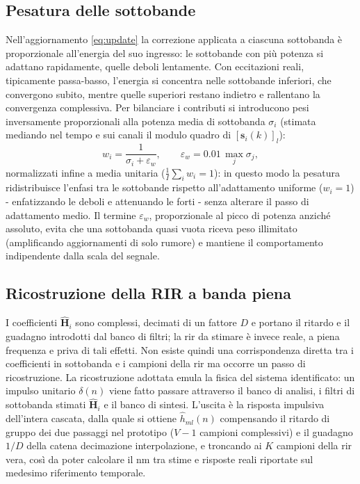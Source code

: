 \documentclass[11pt,a4paper]{article}
\begin{document}
	\subsection{Pesatura delle sottobande}\label{ssec:weights}
	Nell'aggiornamento \eqref{eq:update} la correzione applicata a ciascuna sottobanda è proporzionale all'energia del suo ingresso: le sottobande con più potenza si adattano rapidamente, quelle deboli lentamente.
	Con eccitazioni reali, tipicamente passa-basso, l'energia si concentra nelle sottobande inferiori, che convergono subito, mentre quelle superiori restano indietro e rallentano la convergenza complessiva.
	Per bilanciare i contributi si introducono pesi inversamente proporzionali alla potenza media di sottobanda $\sigma_i$ (stimata mediando nel tempo e sui canali il modulo quadro di $[\mathbf{s}_i(k)]_l$):
	\begin{equation}
		w_i = \frac{1}{\sigma_i + \varepsilon_w},
		\qquad \varepsilon_w = 0{.}01\, \max_j \sigma_j,
		\label{eq:weights}
	\end{equation}
	normalizzati infine a media unitaria ($\frac{1}{I}\sum_i w_i = 1$): in questo modo la pesatura ridistribuisce l'enfasi tra le sottobande rispetto all'adattamento uniforme ($w_i = 1$) - enfatizzando le deboli e attenuando le forti - senza alterare il passo di adattamento medio.
	Il termine $\varepsilon_w$, proporzionale al picco di potenza anziché assoluto, evita che una sottobanda quasi vuota riceva peso illimitato (amplificando aggiornamenti di solo rumore) e mantiene il comportamento indipendente dalla scala del segnale.
	
	\subsection{Ricostruzione della RIR a banda piena}\label{ssec:h_recon}
	I coefficienti $\hat{\mathbf{H}}_i$ sono complessi, decimati di un fattore $D$ e portano il ritardo e il guadagno introdotti dal banco di filtri; la \ac{rir} da stimare è invece reale, a piena frequenza e priva di tali effetti. Non esiste quindi una corrispondenza diretta tra i coefficienti in sottobanda e i campioni della \ac{rir} ma occorre un passo di ricostruzione.
	La ricostruzione adottata emula la fisica del sistema identificato: un impulso unitario $\delta(n)$ viene fatto passare attraverso il banco di analisi, i filtri di sottobanda stimati $\hat{\mathbf{H}}_i$ e il banco di sintesi.
	L'uscita è la risposta impulsiva dell'intera cascata, dalla quale si ottiene $\hat{h}_{ml}(n)$ compensando il ritardo di gruppo dei due passaggi nel prototipo ($V-1$ campioni complessivi) e il guadagno $1/D$ della catena decimazione interpolazione, e troncando ai $K$ campioni della \ac{rir} vera, così da poter calcolare il \ac{nm} tra stime e risposte reali riportate sul medesimo riferimento temporale.
	
\end{document}
